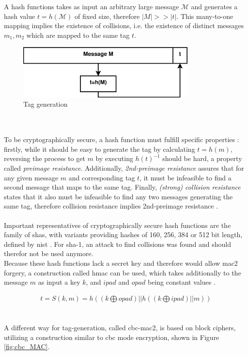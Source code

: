 \\
\\
A hash functions takes as input an arbitrary large message $\mathcal{M}$ and generates a hash value $t = h(\mathcal{M})$ of fixed size, therefore $|M| >> |t|$. This many-to-one
mapping implies the existence of collisions, i.e. the existence of distinct messages $m_1, m_2$ which are mapped to the same tag $t$.
\begin{figure}
    \centering
    \includegraphics[width=0.8\textwidth]{figures/tag.eps}
    \caption{Tag generation}
    \label{fig:tag}
\end{figure}
\\
\\
To be cryptographically secure, a hash function must fulfill specific properties \cite{6732428}: firstly, while it should be easy to generate the tag
by calculating $t = h(m)$, reversing the process to get $m$ by executing $h(t)^{-1}$ should be hard, a property called \textit{preimage resistance}. 
Additionally, \textit{2nd-preimage resistance} assures that for any given message $m$ and corresponding tag $t$, it must be infeasible to find a second message
that maps to the same tag. Finally, \textit{(strong) collision resistance} states that it also must be infeasible to find any two messages generating
the same tag, therefore collision resistance implies 2nd-preimage resistance \cite{handbookCR}.
\\
\\
Important representatives of cryptographically secure hash functions are the family of \glspl{sha}, with variants providing hashes of 160, 256, 384 or 512 bit 
length, defined by \gls{nist} \cite{nistSHA}. For \gls{sha}-1, an attack to find collisions was found \cite{Wang05findingcollisions} and should therefor not
be used anymore.
\\
Because these hash functions lack a secret key and therefore would allow \gls{mac2} forgery, a construction called \gls{hmac} can be used, which takes 
additionally to the message $m$ as input a key $k$, and $ipad$ and $opad$ being constant values \cite{hmac}.

\begin{align}
 t = S(k, m) = h((k \bigoplus opad) || h((k \bigoplus ipad) || m)) 
\end{align}
\\
\\
A different way for tag-generation, called \gls{cbc}-\gls{mac2}, is based on block ciphers, utilizing a construction similar to \gls{cbc} mode encryption,
shown in Figure \ref{fig:cbc_MAC}. 

